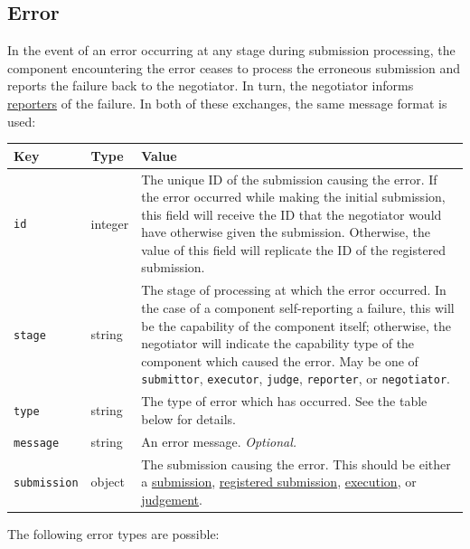 \documentclass[11pt,letterpaper]{article}
\begin{document}
\subsection{Error}
\label{formats-error}

In the event of an error occurring at any stage during submission processing,
the component encountering the error ceases to process the erroneous submission
and reports the failure back to the negotiator. In turn, the negotiator informs
\hyperref[design-reporter]{reporters} of the failure. In both of these
exchanges, the same message format is used:

\nopagebreak
\begin{tabulary}{\textwidth}{ | l | l | L | }
    \hline
    \textbf{Key} & \textbf{Type} & \textbf{Value} \\
    \hline
    \texttt{id} & integer & The unique ID of the submission causing the error.
        If the error occurred while making the initial submission, this field
        will receive the ID that the negotiator would have otherwise given the
        submission. Otherwise, the value of this field will replicate the ID of
        the registered submission. \\
    \hline
    \texttt{stage} & string & The stage of processing at which the error
        occurred. In the case of a component self-reporting a failure, this
        will be the capability of the component itself; otherwise, the
        negotiator will indicate the capability type of the component which
        caused the error.
        \newline
        \newline
        May be one of \texttt{submittor}, \texttt{executor}, \texttt{judge},
        \texttt{reporter}, or \texttt{negotiator}. \\
    \hline
    \texttt{type} & string & The type of error which has occurred. See the
        table below for details. \\
    \hline
    \texttt{message} & string & An error message. \emph{Optional.} \\
    \hline
    \texttt{submission} & object & The submission causing the error. This
        should be either a \hyperref[formats-sub]{submission},
        \hyperref[formats-reg-sub]{registered submission},
        \hyperref[formats-exec]{execution}, or
        \hyperref[formats-judge]{judgement}. \\
    \hline
\end{tabulary}

The following error types are possible:
\end{document}

